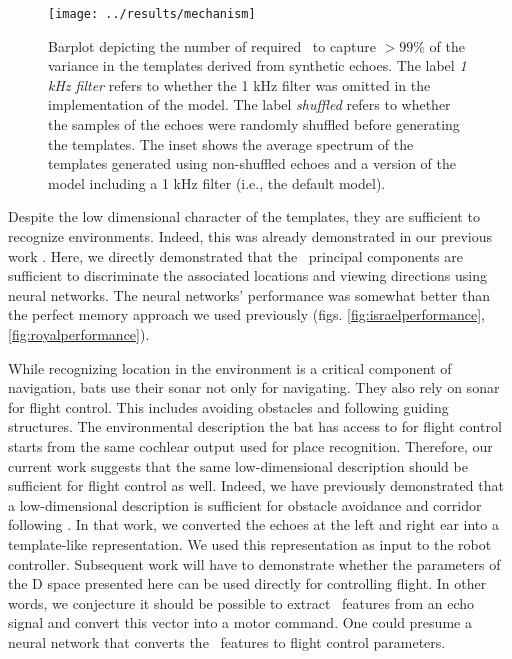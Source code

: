 \documentclass[preprint,5p]{elsarticle}
\begin{document}
\begin{figure}[tb]
	\centering
	\texttt{[image: ../results/mechanism]}
	\caption{Barplot depicting the number of required \pcs\ to capture $>99\%$ of the variance in the templates derived from synthetic echoes. The label \textit{1 kHz filter} refers to whether the 1 kHz filter was omitted in the implementation of the \citet{Wiegrebe2008} model. The label \textit{shuffled} refers to whether the samples of the echoes were randomly shuffled before generating the templates. The inset shows the average spectrum of the templates generated using non-shuffled echoes and a version of the \citet{Wiegrebe2008} model including a 1 kHz filter (i.e., the default model).}
	\label{fig:mechanism}
\end{figure}

Despite the low dimensional character of the templates, they are sufficient to recognize environments. Indeed, this was already demonstrated in our previous work \citep{Vanderelst2016}. Here, we directly demonstrated that the \pca\ principal components are sufficient to discriminate the associated locations and viewing directions using neural networks. The neural networks' performance was somewhat better than the perfect memory approach we used previously (figs. \ref{fig:israelperformance}, \ref{fig:royalperformance}).

While recognizing location in the environment is a critical component of navigation, bats use their sonar not only for navigating. They also rely on sonar for flight control. This includes avoiding obstacles and following guiding structures. The environmental description the bat has access to for flight control starts from the same cochlear output used for place recognition. Therefore, our current work suggests that the same low-dimensional description should be sufficient for flight control as well. Indeed, we have previously demonstrated that a low-dimensional description is sufficient for obstacle avoidance and corridor following \citep{Vanderelst2015a,Mansour2019}. In that work, we converted the echoes at the left and right ear into a template-like representation. We used this representation as input to the robot controller. Subsequent work will have to demonstrate whether the parameters of the \pca D space presented here can be used directly for controlling flight. In other words, we conjecture it should be possible to extract \pca\ features from an echo signal and convert this vector into a motor command. One could presume a neural network that converts the \pca\ features to flight control parameters.
\end{document}
